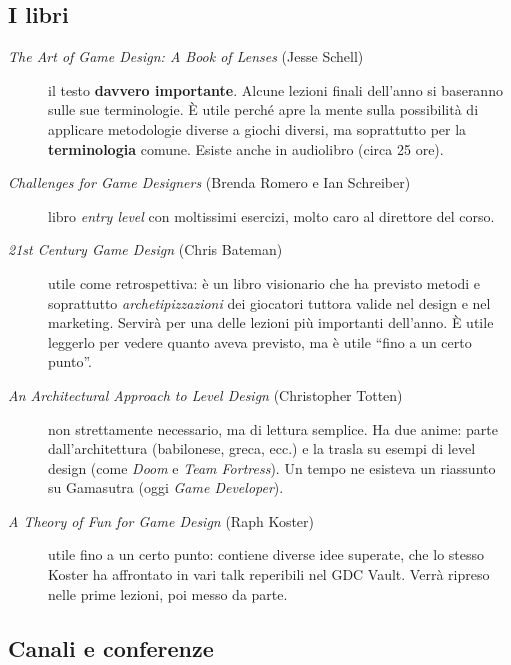 \subsection{I libri}



\begin{description}
  \item[\emph{The Art of Game Design: A Book of Lenses} (Jesse Schell)] il
        testo \textbf{davvero importante}. Alcune lezioni finali dell'anno si
        baseranno sulle sue terminologie. È utile perché apre la mente sulla
        possibilità di applicare metodologie diverse a giochi diversi, ma
        soprattutto per la \textbf{terminologia} comune. Esiste anche in
        audiolibro (circa 25 ore).
  \item[\emph{Challenges for Game Designers} (Brenda Romero e Ian Schreiber)]
        libro \emph{entry level} con moltissimi esercizi, molto caro al
        direttore del corso.
  \item[\emph{21st Century Game Design} (Chris Bateman)] utile come
        retrospettiva: è un libro visionario che ha previsto metodi e
        soprattutto \emph{archetipizzazioni} dei giocatori tuttora valide nel
        design e nel marketing. Servirà per una delle lezioni più importanti
        dell'anno. È utile leggerlo per vedere quanto aveva previsto, ma è
        utile ``fino a un certo punto''.
  \item[\emph{An Architectural Approach to Level Design} (Christopher
        Totten)] non strettamente necessario, ma di lettura semplice. Ha due
        anime: parte dall'architettura (babilonese, greca, ecc.) e la trasla
        su esempi di level design (come \emph{Doom} e \emph{Team Fortress}).
        Un tempo ne esisteva un riassunto su Gamasutra (oggi
        \emph{Game Developer}).
  \item[\emph{A Theory of Fun for Game Design} (Raph Koster)] utile fino a un
        certo punto: contiene diverse idee superate, che lo stesso Koster ha
        affrontato in vari talk reperibili nel GDC Vault. Verrà ripreso nelle
        prime lezioni, poi messo da parte.
\end{description}

\subsection{Canali e conferenze}

